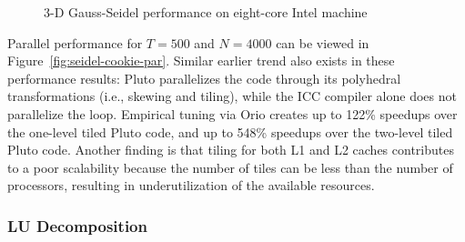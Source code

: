 \begin{figure} [htb]
\begin{center} 
    
\end{center}
\vspace{-.2in} 
\caption{3-D Gauss-Seidel performance on eight-core Intel machine} 
\label{fig:seidel-cookie-results} 
\end{figure} 

Parallel performance for $T=500$ and $N=4000$ can be viewed in
Figure~\ref{fig:seidel-cookie-par}. Similar earlier trend also exists
in these performance results: Pluto parallelizes the code through its
polyhedral transformations (i.e., skewing and tiling), while the ICC
compiler alone does not parallelize the loop. Empirical tuning via
Orio creates up to 122\% speedups over the one-level tiled Pluto code,
and up to 548\% speedups over the two-level tiled Pluto code. Another
finding is that tiling for both L1 and L2 caches contributes to a poor
scalability because the number of tiles can be less than the number of
processors, resulting in underutilization of the available resources.

\subsubsection{LU Decomposition}  
 
